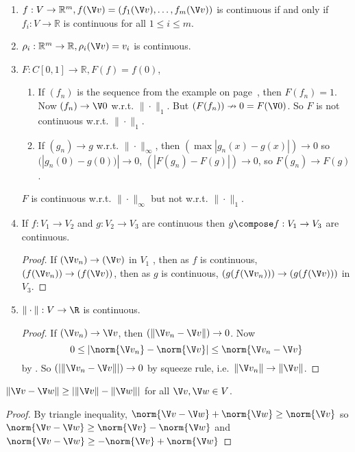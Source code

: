 \documentclass[a4paper]{article}
\theoremstyle{definition}
\begin{document}
\begin{eg}\leavevmode
  \label{eg:continuity}
  \begin{enumerate}
  \item $f:V\to \mathbb{R}^m, f(\V v) = (f_1(\V v), \ldots, f_m(\V v))$ is continuous if and only if $f_i:V\to \mathbb{R}$ is continuous for all $1\leq i \leq m$.
  \item $\rho_i:\mathbb{R}^m\to \mathbb{R}, \rho_i(\V v) =v_i$ is continuous.
  \item $F:C[0,1]\to\mathbb{R}, F(f)=f(0)$,
    \begin{enumerate}
    \item If $(f_n)$ is the sequence from the example on page~\pageref{eg:fdown}, then $F(f_n)=1$. Now $(f_n)\to \V 0$ w.r.t. $\|\cdot\|_1$. But $(F(f_n))\nrightarrow 0=F(\V 0)$. So $F$ is not continuous w.r.t. $\|\cdot\|_1$.
      \item If $(g_n)\to g$ w.r.t. $\|\cdot\|_\infty$, then $(\max|g_n(x)-g(x)|)\to 0$ so $(|g_n(0)-g(0))|\to 0$, $(|F(g_n)-F(g)|)\to 0$, so $F(g_n)\to F(g)$.
    \end{enumerate}
    $F$ is continuous w.r.t. $\|\cdot\|_\infty$ but not w.r.t. $\|\cdot\|_1$.
  \item If $f:V_1\to V_2$ and $g:V_2\to V_3$ are continuous then $g\compose f: V_1\to V_3$ are continuous.
    \begin{proof}
      If $(\V v_n) \to (\V v)$ in $V_1$ , then as $f$ is continuous, $(f(\V v_n)) \to (f(\V v))$, then as $g$ is continuous, $(g(f(\V v_n))) \to (g(f(\V v)))$ in $V_3$.
    \end{proof}
  \item $\|\cdot\|: V \to \R$ is continuous.
    \begin{proof}
      If $(\V v_n)\to \V v$, then $(\|\V v_n - \V v\|) \to 0$. Now
    \[
      0 \leq |\norm{\V v_n} - \norm{\V v}| \leq \norm{\V v_n - \V v}
    \]
    by . So $(|\|\V v_n - \V v\||) \to 0$ by squeeze rule, i.e.\ $\|\V v_n\| \to \|\V v\|$.
  \end{proof}
  \end{enumerate}
\end{eg}

\begin{lemma}
  \label{lem:alternate triangle}
  $\|\V v- \V w\| \geq |\|\V v\| - \|\V w\||$ for all $\V v, \V w \in V$.
\end{lemma}

\begin{proof}
  By triangle inequality, \(\norm{\V v - \V w} + \norm{\V w} \geq \norm{\V v}\) so \(\norm{\V v - \V w} \geq \norm{\V v} - \norm{\V w}\) and \(\norm{\V v - \V w} \geq - \norm{\V v} + \norm{\V w}\) 
\end{proof}
\end{document}

